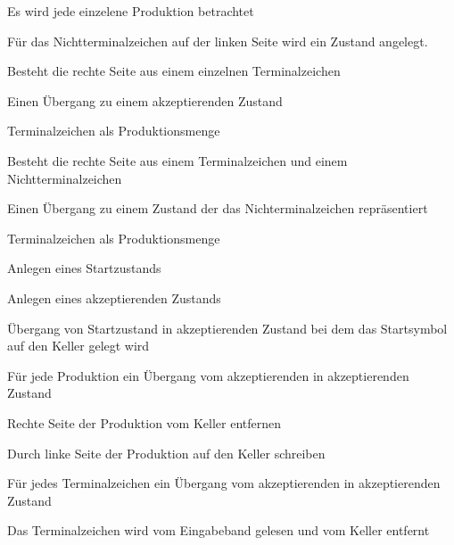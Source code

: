 {
    \begin{itemgroup}{}
	\item Es wird jede einzelene Produktion betrachtet
	\item Für das Nichtterminalzeichen auf der linken Seite wird ein Zustand
	angelegt.
	\item Besteht die rechte Seite aus einem einzelnen Terminalzeichen
  		\begin{itemgroup}{}
    	\item Einen Übergang zu einem akzeptierenden Zustand
    	\item Terminalzeichen als Produktionsmenge
    	\end{itemgroup}
	\item Besteht die rechte Seite aus einem Terminalzeichen und einem Nichtterminalzeichen
  		\begin{itemgroup}{}
    	\item Einen Übergang zu einem Zustand der das Nichterminalzeichen repräsentiert
		\item Terminalzeichen als Produktionsmenge
		 \end{itemgroup}
    \end{itemgroup}
	\vfill{}
}

{
    \begin{itemgroup}{}
	\item Anlegen eines Startzustands
	\item Anlegen eines akzeptierenden Zustands
	\item Übergang von Startzustand in akzeptierenden Zustand bei dem das 
	Startsymbol auf den Keller gelegt wird
	\item Für jede Produktion ein Übergang vom akzeptierenden in akzeptierenden
	Zustand
		\begin{itemgroup}{}
    	\item Rechte Seite der Produktion vom Keller entfernen
    	\item Durch linke Seite der Produktion auf den Keller schreiben
    	\end{itemgroup}
	\item Für jedes Terminalzeichen ein Übergang vom akzeptierenden in akzeptierenden
	Zustand
		\begin{itemgroup}{}
    	\item Das Terminalzeichen wird vom Eingabeband gelesen und vom Keller
    	entfernt \end{itemgroup}
	\end{itemgroup}
  
	\vfill{}
}

